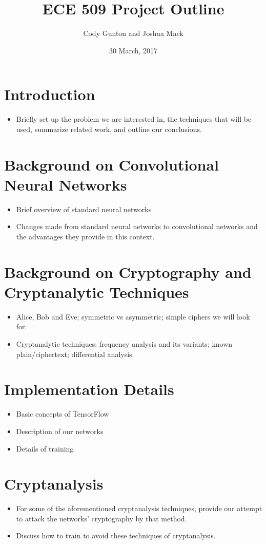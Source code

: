 \documentclass[11pt, conference]{IEEEtran}
\title{ECE 509 Project Outline}
\author{Cody Gunton and Joshua Mack}
\date{30 March, 2017}
\begin{document}
\maketitle
\section{Introduction}
\begin{itemize}
    \item Briefly set up the problem we are interested in, the techniques that will be used, summarize related work, and outline our conclusions.
\end{itemize}

\section{Background on Convolutional Neural Networks}
\begin{itemize}
    \item Brief overview of standard neural networks
    \item Changes made from standard neural networks to convolutional networks and the advantages they provide in this context.
\end{itemize}

\section{Background on Cryptography and Cryptanalytic Techniques}
\begin{itemize}
    \item Alice, Bob and Eve; symmetric vs asymmetric; simple ciphers we will look for.
    \item Cryptanalytic techniques: frequency analysis and its variants; known plain/ciphertext; differential analysis.
\end{itemize}

\section{Implementation Details}
\begin{itemize}
    \item Basic concepts of TensorFlow
    \item Description of our networks
    \item Details of training 
\end{itemize}

\section{Cryptanalysis}
\begin{itemize}
    \item For some of the aforementioned cryptanalysis techniques, provide our attempt to attack the networks' cryptography by that method.
    \item Discuss how to train to avoid these techniques of cryptanalysis. 
\end{itemize}
\end{document}
